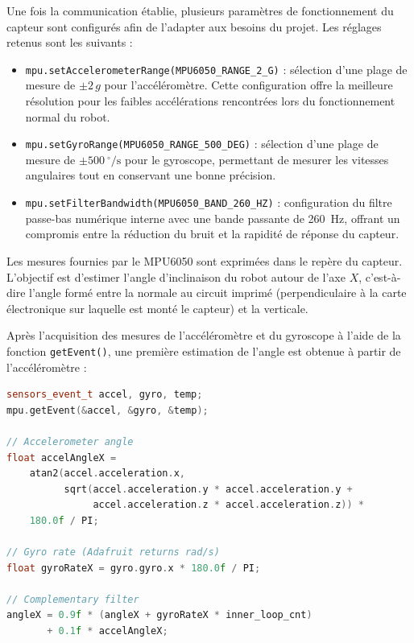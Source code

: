 Une fois la communication établie, plusieurs paramètres de fonctionnement du capteur sont configurés afin de l'adapter aux besoins du projet. Les réglages retenus sont les suivants :

\begin{itemize}
    \item \texttt{mpu.setAccelerometerRange(MPU6050\_RANGE\_2\_G)} : sélection d'une plage de mesure de $\pm2\,g$ pour l'accéléromètre. Cette configuration offre la meilleure résolution pour les faibles accélérations rencontrées lors du fonctionnement normal du robot.
    \item \texttt{mpu.setGyroRange(MPU6050\_RANGE\_500\_DEG)} : sélection d'une plage de mesure de $\pm500~^\circ/\mathrm{s}$ pour le gyroscope, permettant de mesurer les vitesses angulaires tout en conservant une bonne précision.
    \item \texttt{mpu.setFilterBandwidth(MPU6050\_BAND\_260\_HZ)} : configuration du filtre passe-bas numérique interne avec une bande passante de 260~Hz, offrant un compromis entre la réduction du bruit et la rapidité de réponse du capteur.
\end{itemize}

Les mesures fournies par le MPU6050 sont exprimées dans le repère du capteur. L'objectif est d'estimer l'angle d'inclinaison du robot autour de l'axe $X$, c'est-à-dire l'angle formé entre la normale au circuit imprimé (perpendiculaire à la carte électronique sur laquelle est monté le capteur) et la verticale.

Après l'acquisition des mesures de l'accéléromètre et du gyroscope à l'aide de la fonction \texttt{getEvent()}, une première estimation de l'angle est obtenue à partir de l'accéléromètre :

\begin{lstlisting}[language=C++, caption={Calcul de l'angle et filtre complémentaire}, label={lst:imu_complementary_filter}]
sensors_event_t accel, gyro, temp;
mpu.getEvent(&accel, &gyro, &temp);

// Accelerometer angle
float accelAngleX =
    atan2(accel.acceleration.x,
          sqrt(accel.acceleration.y * accel.acceleration.y +
               accel.acceleration.z * accel.acceleration.z)) *
    180.0f / PI;

// Gyro rate (Adafruit returns rad/s)
float gyroRateX = gyro.gyro.x * 180.0f / PI;

// Complementary filter
angleX = 0.9f * (angleX + gyroRateX * inner_loop_cnt)
       + 0.1f * accelAngleX;
\end{lstlisting}

